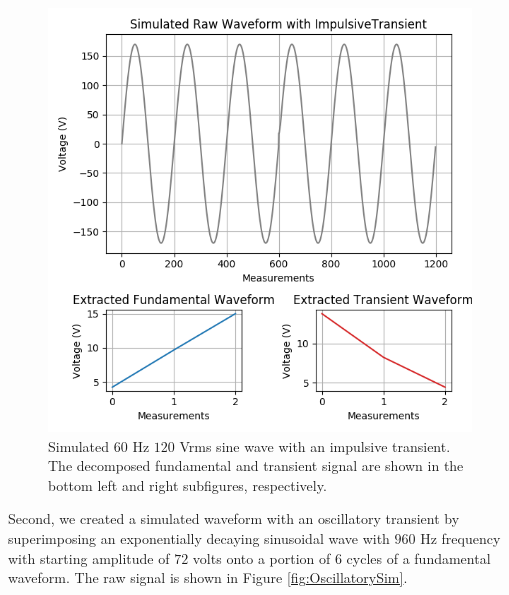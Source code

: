 \documentclass[10pt, conference, compsocconf]{IEEEtran}
\begin{document}
\begin{figure}[ht]
\centering%
\includegraphics[scale=0.35]{./figures/impulsive_sim.png}
\caption{Simulated $60$ Hz $120$ Vrms sine wave with an impulsive transient. The decomposed fundamental and transient signal are shown in the bottom left and right subfigures, respectively.}\label{fig:ImpulsiveSim}
\end{figure}

Second, we created a simulated waveform with an oscillatory transient by superimposing an exponentially decaying sinusoidal wave with $960$ Hz frequency with starting amplitude of $72$ volts onto a portion of $6$ cycles of a fundamental waveform. The raw signal is shown in Figure \ref{fig:OscillatorySim}.
\end{document}
